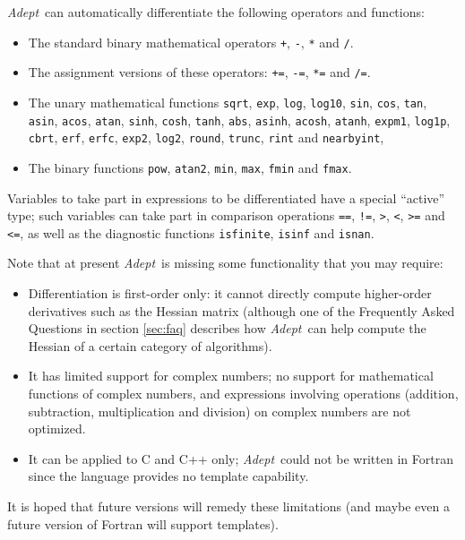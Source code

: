 \documentclass[a4,oneside]{book}
\def\codesize{\small}
\def\Adept{\emph{Adept}}
\def\code#1{{\codesize\texttt{#1}}}
\begin{document}
%
\Adept\ can automatically differentiate the following
operators and functions:
\begin{itemize}
\item The standard binary mathematical operators \code{+}, \code{-},
  \code{*} and \code{/}.
\item The assignment versions of these operators:
  \code{+=}, \code{-=}, \code{*=} and \code{/=}.
\item The unary mathematical functions \code{sqrt}, \code{exp},
  \code{log}, \code{log10}, \code{sin}, \code{cos}, \code{tan},
  \code{asin}, \code{acos}, \code{atan}, \code{sinh}, \code{cosh},
  \code{tanh}, \code{abs}, \code{asinh}, \code{acosh}, \code{atanh},
  \code{expm1}, \code{log1p}, \code{cbrt}, \code{erf}, \code{erfc},
  \code{exp2}, \code{log2}, \code{round}, \code{trunc}, \code{rint}
  and \code{nearbyint},
\item The binary functions \code{pow}, \code{atan2}, \code{min},
  \code{max}, \code{fmin} and \code{fmax}.
\end{itemize}
Variables to take part in expressions to be differentiated have a
special ``active'' type; such variables can take part in comparison
operations \code{==}, \code{!=}, \code{>}, \code{<}, \code{>=} and
\code{<=}, as well as the diagnostic functions \code{isfinite},
\code{isinf} and \code{isnan}.

Note that at present \Adept\ is missing some functionality that you may
require:

\begin{itemize}
\item Differentiation is first-order only: it cannot directly compute
  higher-order derivatives such as the Hessian matrix (although one of
  the Frequently Asked Questions in section \ref{sec:faq} describes
  how \Adept\ can help compute the Hessian of a certain category of
  algorithms).
\item It has limited support for complex numbers; no support for
  mathematical functions of complex numbers, and expressions involving
  operations (addition, subtraction, multiplication and division) on
  complex numbers are not optimized.
\item It can be applied to C and C++ only; \Adept\ could not be
  written in Fortran since the language provides no template
  capability.
\end{itemize}%
%
It is hoped that future versions will remedy these limitations (and
maybe even a future version of Fortran will support templates).
\end{document}
